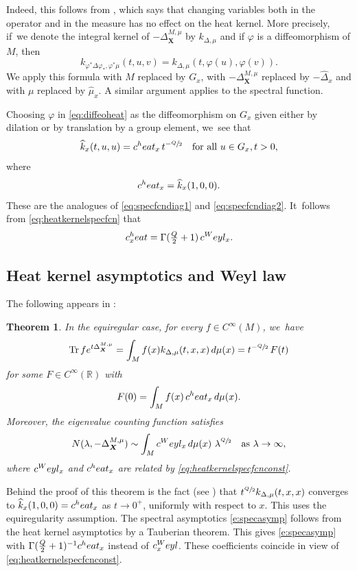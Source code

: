 \documentclass[11pt]{article}
\let\oldsfrac\sfrac
\renewcommand{\sfrac}[2]{{\oldsfrac{#1}{#2}}}
\newcommand{\heat}{\textup{heat}}
\newcommand{\Weyl}{\textup{Weyl}}
\newcommand{\bX}{{\boldsymbol{X}}}
\newtheorem{theorem}{Theorem}[section]
\theoremstyle{definition}
\newcommand{\1}{\mathbbm{1}}
\newcommand{\R}{\mathbb{R}}
\DeclareMathOperator{\Tr}{Tr}
\numberwithin{equation}{section}
\begin{document}
Indeed, this follows from \cite[third relation in (85)]{CHT}, which says that changing variables both in the operator and in the measure has no effect on the heat kernel. More precisely, if~we denote the integral kernel of $-\Delta^{M,\mu}_\bX$ by $k_{\Delta,\mu}$ and if $\varphi$ is a diffeomorphism of $M$, then
\begin{equation}
\label{eq:diffeoheat}
k_{\varphi^* \Delta \varphi_*, \varphi^*\mu}(t,u,v)=k_{\Delta,\mu}(t,\varphi(u),\varphi(v)).
\end{equation}
We apply this formula with $M$ replaced by $G_x$, with $-\Delta^{M,\mu}_\bX$ replaced by $-\widehat\Delta_x$ and with $\mu$ replaced by $\widehat\mu_x$. A similar argument applies to the spectral function.

Choosing $\varphi$ in \eqref{eq:diffeoheat} as the diffeomorphism on $G_x$ given either by dilation or by translation by a group element, we~see that
\[
\widehat k_x(t,u,u) = c^\heat_x \,t^{-\sfrac Q2}
\quad\text{for all}\ u\in G_x,\\ t>0,
\]
where
\[
c^\heat_x = \widehat k_x(1,0,0).
\]
These are the analogues of \eqref{eq:specfcndiag1} and \eqref{eq:specfcndiag2}. It~follows from \eqref{eq:heatkernelspecfcn} that
\begin{equation}
\label{eq:heatkernelspecfcnconst}
c_x^\heat = \Gamma(\tfrac Q2+1) \,c^\Weyl_x.
\end{equation}

\subsection{Heat kernel asymptotics and Weyl law}
The following appears in \cite[Th.\,I \& 4.1]{CHT1}:

\begin{theorem}\label{weylapp}
In the equiregular case, for every $f\in C^\infty(M)$, we~have
\[
\Tr f e^{t\Delta^{M,\mu}_\bX} =
\int_M f(x)k_{\Delta,\mu}(t,x,x)\,d\mu(x) = t^{-\sfrac Q2}\,F(t)
\]
for some $F\in C^\infty(\R)$ with
\[
F(0)=\int_M f(x) \,c^\heat_x \,d\mu(x).
\]
Moreover, the eigenvalue counting function satisfies
\begin{equation}\label{e:specasymp}
N(\lambda,-\Delta^{M,\mu}_\bX)\sim \int_M c^\Weyl_x \,d\mu(x) \ \lambda^{\sfrac Q2}
\quad\text{as}\ \lambda\to\infty,
\end{equation}
where $c^\Weyl_x$ and $c^\heat_x$ are related by \eqref{eq:heatkernelspecfcnconst}.
\end{theorem}

Behind the proof of this theorem is the fact (see \cite[Th.\,C.1 and Eq.\,(96)]{CHT1}) that $t^{\sfrac Q2} k_{\Delta,\mu}(t,x,x)$ converges to $\widehat{k}_x(1,0,0)=c^\heat_x$ as $t\to 0^+$, uniformly with respect to $x$. This uses the equiregularity assumption. The spectral asymptotics \eqref{e:specasymp} follows from the heat kernel asymptotics by a Tauberian theorem. This gives \eqref{e:specasymp} with $\Gamma(\frac Q2 +1)^{-1} c^\heat_x$ instead of $c_x^\Weyl$. These coefficients coincide in view of \eqref{eq:heatkernelspecfcnconst}.
\end{document}
